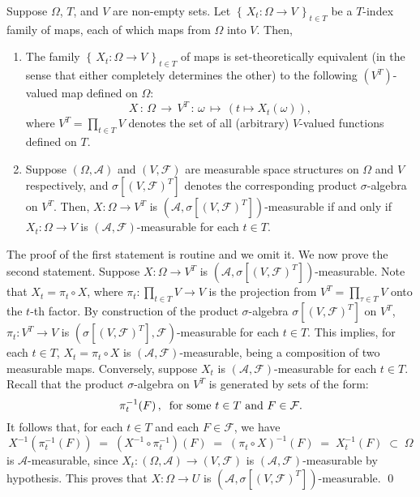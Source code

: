 \begin{theorem}
\mbox{}\vskip 0.1cm
\noindent
Suppose $\Omega$, $T$, and $V$ are non-empty sets.
Let $\left\{\,X_{t} : \Omega \longrightarrow V \,\right\}_{t \in T}$
be a $T$-index family of maps, each of which maps from $\Omega$ into $V$.
Then,
\begin{enumerate}
\item
The family $\left\{\,X_{t} : \Omega \longrightarrow V \,\right\}_{t \in T}$
of maps is set-theoretically equivalent (in the sense that either completely determines the other)
to the following $(V^{T})$-valued map defined on $\Omega$:
\begin{equation*}
X \,:\, \Omega \,\longrightarrow\, V^{T} \,:\, \omega \,\longmapsto\, \left(t \longmapsto X_{t}(\omega)\right),
\end{equation*}
where $V^{T} = \prod_{t\in T}V$ denotes the set of all (arbitrary) $V$-valued functions defined on $T$.
\item
Suppose $\left(\Omega,\mathcal{A}\right)$ and $\left(V,\mathcal{F}\right)$
are measurable space structures on $\Omega$ and $V$ respectively, and
$\sigma[(V,\mathcal{F})^{T}]$ denotes the corresponding product $\sigma$-algebra on $V^{T}$.
Then, $X : \Omega \longrightarrow V^{T}$ is
$\left(\mathcal{A},\sigma[(V,\mathcal{F})^{T}]\right)$-measurable if and only if
$X_{t} : \Omega \longrightarrow V$ is $(\mathcal{A},\mathcal{F})$-measurable for each $t \in T$.
\end{enumerate}
\end{theorem}
\proof
The proof of the first statement is routine and we omit it.
We now prove the second statement.
Suppose $X : \Omega \longrightarrow V^{T}$
is $(\mathcal{A},\sigma[(V,\mathcal{F})^{T}])$-measurable.
Note that $X_{t} = \pi_{t} \circ X$, where $\pi_{t} : \prod_{t\in T}V \longrightarrow V$
is the projection from $V^{T} = \prod_{\tau\in T}V$ onto the $t$-th factor.
By construction of the product $\sigma$-algebra $\sigma[(V,\mathcal{F})^{T}]$ on $V^{T}$,
$\pi_{t} : V^{T} \longrightarrow V$ is $(\sigma[(V,\mathcal{F})^{T}],\mathcal{F})$-measurable
for each $t \in T$.
This implies, for each $t \in T$, $X_{t} = \pi_{t} \circ X$ is
$(\mathcal{A},\mathcal{F})$-measurable, being a composition of two measurable maps.
Conversely, suppose $X_{t}$ is $(\mathcal{A},\mathcal{F})$-measurable for each $t \in T$.
Recall that the product $\sigma$-algebra on $V^{T}$ is generated by
sets of the form:
\begin{equation*}
\pi^{-1}_{t}\!\left(F\right),
\;\;\textnormal{for some $t \in T$ and $F \in \mathcal{F}$}.
\end{equation*}
It follows that, for each $t \in T$ and each $F \in \mathcal{F}$, we have
\begin{equation*}
X^{-1}\!\left(\pi^{-1}_{t}\!\left(F\right)\right)
\; = \; (X^{-1}\circ\pi^{-1}_{t})\!\left(F\right)
\; = \; (\pi_{t} \circ X)^{-1}\!\left(F\right)
\; = \; X_{t}^{-1}\!\left(F\right)
\; \subset \; \Omega
\end{equation*}
is $\mathcal{A}$-measurable, since
$X_{t} : (\Omega,\mathcal{A}) \longrightarrow (V,\mathcal{F})$
is $(\mathcal{A},\mathcal{F})$-measurable by hypothesis.
This proves that $X : \Omega \longrightarrow U$ is
$(\mathcal{A},\sigma[(V,\mathcal{F})^{T}])$-measurable.
\qed

